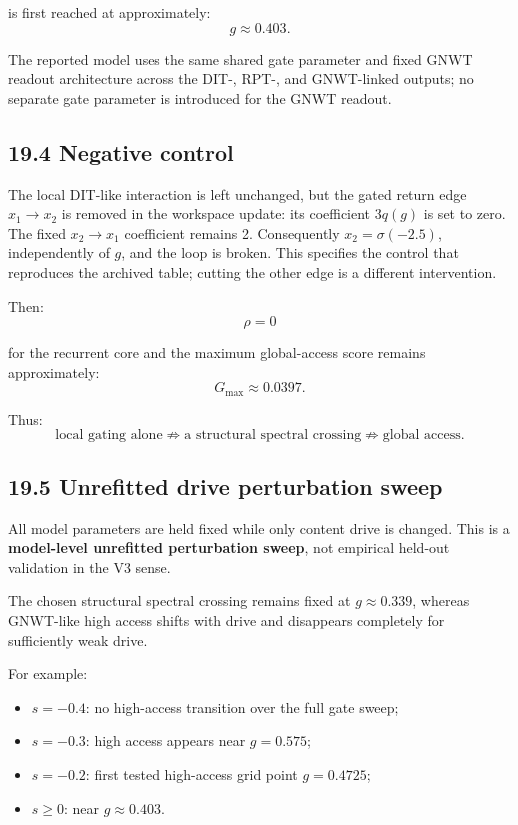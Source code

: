 \documentclass[
  11pt,
  a4paper,
]{article}
\providecommand{\tightlist}{%
  \setlength{\itemsep}{0pt}\setlength{\parskip}{0pt}}
\begin{document}
is first reached at approximately:
\nopagebreak[4]
\[
\boxed{
g\approx0.403.
}
\]

The reported model uses the same shared gate parameter and fixed GNWT
readout architecture across the DIT-, RPT-, and GNWT-linked outputs; no
separate gate parameter is introduced for the GNWT readout.

\hypertarget{negative-control}{%
\subsection{19.4 Negative control}\label{negative-control}}

The local DIT-like interaction is left unchanged, but the gated return
edge \(x_1\to x_2\) is removed in the workspace update: its coefficient
\(3q(g)\) is set to zero. The fixed \(x_2\to x_1\) coefficient remains
2. Consequently \(x_2=\sigma(-2.5)\), independently of \(g\), and the
loop is broken. This specifies the control that reproduces the archived
table; cutting the other edge is a different intervention.

Then:
\nopagebreak[4]
\[
\rho=0
\]

for the recurrent core and the maximum global-access score remains
approximately:
\nopagebreak[4]
\[
G_{\max}\approx0.0397.
\]

Thus:
\nopagebreak[4]
\[
\boxed{
\text{local gating alone}
\not\Rightarrow
\text{a structural spectral crossing}
\not\Rightarrow
\text{global access}.
}
\]

\hypertarget{unrefitted-drive-perturbation-sweep}{%
\subsection{19.5 Unrefitted drive perturbation
sweep}\label{unrefitted-drive-perturbation-sweep}}

All model parameters are held fixed while only content drive is changed.
This is a \textbf{model-level unrefitted perturbation sweep}, not
empirical held-out validation in the V3 sense.

The chosen structural spectral crossing remains fixed at
\(g\approx0.339\), whereas GNWT-like high access shifts with drive and
disappears completely for sufficiently weak drive.

For example:

\begin{itemize}
\tightlist
\item
  \(s=-0.4\): no high-access transition over the full gate sweep;
\item
  \(s=-0.3\): high access appears near \(g=0.575\);
\item
  \(s=-0.2\): first tested high-access grid point \(g=0.4725\);
\item
  \(s\ge0\): near \(g\approx0.403\).
\end{itemize}
\end{document}
